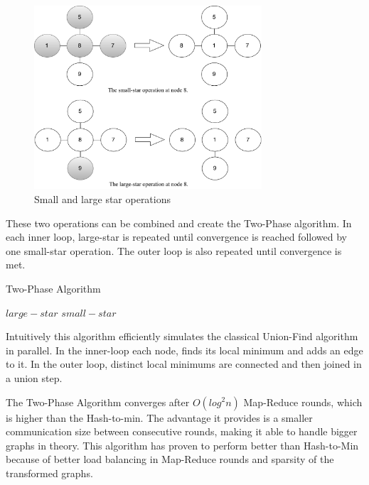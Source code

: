 \begin{figure}[ht]
  \centering
    \includegraphics[width=20pc]{figures/two_phase}
  \caption{Small and large star operations}
  \label{fig:smalllargestar}
\end{figure}

These two operations can be combined and create the Two-Phase algorithm. In each inner loop, large-star is repeated until convergence is reached followed by one small-star operation. The outer loop is also repeated until convergence is met.

\begin{algorithm}[!h]
        \caption{Two-Phase Algorithm}
        \label{algo:two_phase}
        \begin{algorithmic}[1]
                        \Repeat
                                \Repeat
                                        \State $large-star$
                        \State $small-star$
                \EndFunction
        \end{algorithmic}
\end{algorithm}

Intuitively this algorithm efficiently simulates the classical Union-Find algorithm in parallel. In the inner-loop each node, finds its local minimum and adds an edge to it. In the outer loop, distinct local minimums are connected and then joined in a union step.

The Two-Phase Algorithm converges after $O(log^2 n)$ Map-Reduce rounds, which is higher than the Hash-to-min. The advantage it provides is a smaller communication size between consecutive rounds, making it able to handle bigger graphs in theory. This algorithm has proven to perform better than Hash-to-Min because of better load balancing in Map-Reduce rounds and sparsity of the transformed graphs.
